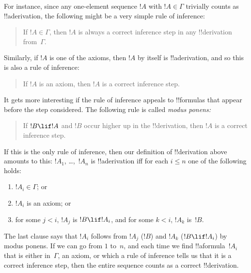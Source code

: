 \documentclass[../../include/open-logic-section]{subfiles}
\begin{document}
For instance, since any one-element sequence $!A$ with $!A \in \Gamma$
trivially counts as !!a{derivation}, the following might be a very
simple rule of inference:
\begin{quote}
  If $!A \in \Gamma$, then $!A$ is always a correct inference step in
  any !!{derivation} from~$\Gamma$.
\end{quote}
Similarly, if $!A$ is one of the axioms, then $!A$ by itself is
!!a{derivation}, and so this is also a rule of inference:
\begin{quote}
  If $!A$ is an axiom, then $!A$ is a correct inference step.
\end{quote}
It gets more interesting if the rule of inference appeals to
!!{formula}s that appear before the step considered. The following
rule is called \emph{modus ponens:}
\begin{quote}
  If $!B \lif !A$ and $!B$ occur higher up in the !!{derivation}, then
  $!A$ is a correct inference step.
\end{quote}
If this is the only rule of inference, then our definition of
!!{derivation} above amounts to this: $!A_1$, \dots,~$!A_n$ is
!!a{derivation} iff for each $i \le n$ one of the following holds:
\begin{enumerate}
\item $!A_i \in \Gamma$; or
\item $!A_i$ is an axiom; or
\item for some $j < i$, $!A_j$ is $!B \lif !A_i$, and for some $k < i$,
  $!A_k$ is~$!B$.
\end{enumerate}
The last clause says that $!A_i$ follows from $!A_j$ ($!B$) and $!A_k$
($!B \lif !A_i$) by modus ponens. If we can go from $1$ to~$n$, and
each time we find !!a{formula}~$!A_i$ that is either in~$\Gamma$, an
axiom, or which a rule of inference tells us that it is a correct
inference step, then the entire sequence counts as a correct
!!{derivation}.
\end{document}
